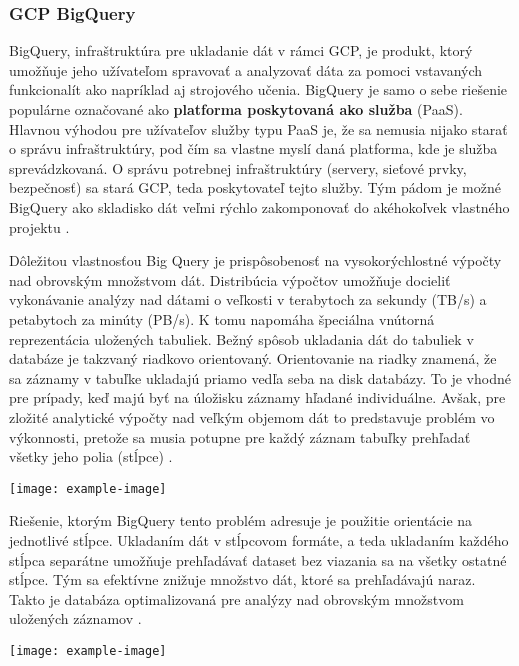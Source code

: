 \subsubsection{GCP BigQuery}

BigQuery, infraštruktúra pre ukladanie dát v rámci GCP, je produkt, ktorý umožňuje jeho užívateľom spravovať a analyzovať dáta za pomoci vstavaných funkcionalít ako napríklad aj strojového učenia.
BigQuery je samo o sebe riešenie populárne označované ako \textbf{platforma poskytovaná ako služba} (PaaS).
Hlavnou výhodou pre užívateľov služby typu PaaS je, že sa nemusia nijako starať o správu infraštruktúry, pod čím sa vlastne myslí daná platforma, kde je služba sprevádzkovaná.
O správu potrebnej infraštruktúry (servery, sieťové prvky, bezpečnosť) sa stará GCP, teda poskytovateľ tejto služby.
Tým pádom je možné BigQuery ako skladisko dát veľmi rýchlo zakomponovať do akéhokoľvek vlastného projektu \cite{google-bq}.

Dôležitou vlastnosťou Big Query je prispôsobenosť na vysokorýchlostné výpočty nad obrovským množstvom dát.
Distribúcia výpočtov umožňuje docieliť vykonávanie analýzy nad dátami o veľkosti v terabytoch za sekundy (TB/s) a petabytoch za minúty (PB/s).
K tomu napomáha špeciálna vnútorná reprezentácia uložených tabuliek. 
Bežný spôsob ukladania dát do tabuliek v databáze je takzvaný riadkovo orientovaný.
Orientovanie na riadky znamená, že sa záznamy v tabuľke ukladajú priamo vedľa seba na disk databázy.
To je vhodné pre prípady, keď majú byť na úložisku záznamy hľadané individuálne.
Avšak, pre zložité analytické výpočty nad veľkým objemom dát to predstavuje problém vo výkonnosti, pretože sa musia potupne pre každý záznam tabuľky prehľadať všetky jeho polia (stĺpce) \cite{google-bq}.

\begin{center}
\noindent\texttt{[image: example-image]}    
\end{center}

Riešenie, ktorým BigQuery tento problém adresuje je použitie orientácie na jednotlivé stĺpce. 
Ukladaním dát v stĺpcovom formáte, a teda ukladaním každého stĺpca separátne umožňuje prehľadávať dataset bez viazania sa na všetky ostatné stĺpce.
Tým sa efektívne znižuje množstvo dát, ktoré sa prehľadávajú naraz.
Takto je databáza optimalizovaná pre analýzy nad obrovským množstvom uložených záznamov \cite{google-bq}.

\begin{center}
\noindent\texttt{[image: example-image]}    
\end{center}

